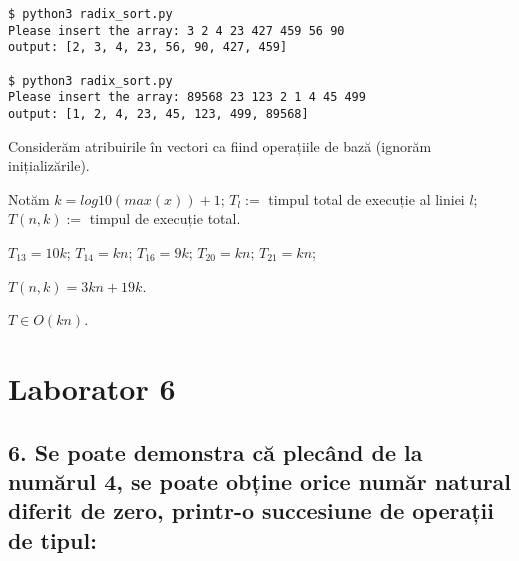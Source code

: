 \documentclass[11pt]{article}
\begin{document}
\begin{verbatim}
$ python3 radix_sort.py
Please insert the array: 3 2 4 23 427 459 56 90
output: [2, 3, 4, 23, 56, 90, 427, 459]

$ python3 radix_sort.py
Please insert the array: 89568 23 123 2 1 4 45 499
output: [1, 2, 4, 23, 45, 123, 499, 89568]
\end{verbatim}


Considerăm atribuirile în vectori ca fiind operațiile de bază (ignorăm inițializările).

Notăm $k = \mathit{log10}(\mathit{max}(x)) + 1$; $T_l := $ timpul total de execuție al liniei $l$; $T(n, k) :=$ timpul de execuție total.

$T_{13} = 10 k$;
$T_{14} = k n$;
$T_{16} = 9 k$;
$T_{20} = k n$;
$T_{21} = k n$;

$T(n, k) = 3kn + 19k$.

\vspace{7pt}
$T \in O(kn)$.


\section*{Laborator 6}
\label{sec:org9e861e0}

\subsection*{6. Se poate demonstra că plecând de la numărul 4, se poate obține orice număr natural diferit de zero, printr-o succesiune de operații de tipul:}
\label{sec:orgf63a4fb}
\end{document}
